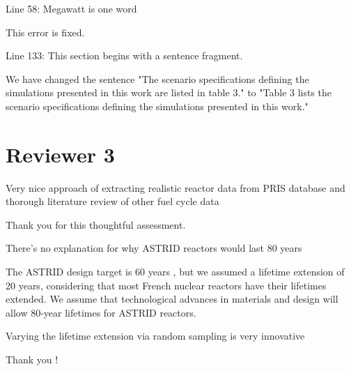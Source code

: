 \documentclass[answers,11pt]{exam}
\begin{document}
\begin{questions}
\begin{solution}
        \end{solution}

        \question Line 58: Megawatt is one word
        \begin{solution}
                This error is fixed.
        \end{solution}

        \question Line 133: This section begins with a sentence fragment.

        \begin{solution}
                We have changed the sentence 
                "The scenario specifications defining the simulations
                presented in this work are listed in table 3."
                to
                "Table 3 lists the scenario specifications defining the
                simulations presented in this work."
        \end{solution}


        \section*{Reviewer 3}
        \question Very nice approach of extracting realistic reactor data from 
        PRIS database and thorough literature review of other fuel cycle data
        \begin{solution}
                Thank you for this thoughtful assessment.
        \end{solution}


        \question There's no explanation for why ASTRID reactors would last 80 
        years

        \begin{solution}
                The ASTRID design target is 60 years \cite{gauche_generation_2012},
                but we assumed a lifetime
                extension of 20 years, considering that most French nuclear reactors
                have their lifetimes extended. We assume that technological
                advances in materials and design will allow 80-year lifetimes
                for ASTRID reactors.
        \end{solution}

        \question Varying the lifetime extension via random sampling is very 
        innovative
        \begin{solution}
                Thank you !
        \end{solution}


\end{questions}
\end{document}

